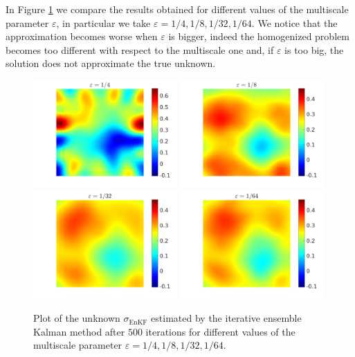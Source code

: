 \documentclass[10pt]{article}
\begin{document}
In Figure \ref{fig:comparison_e} we compare the results obtained for different values of the multiscale parameter $\varepsilon$, in particular we take $\varepsilon = 1/4, 1/8, 1/32, 1/64$. We notice that the approximation becomes worse when $\varepsilon$ is bigger, indeed the homogenized problem becomes too different with respect to the multiscale one and, if $\varepsilon$ is too big, the solution does not approximate the true unknown.

\begin{figure}[t]
\centering
\includegraphics[width = 0.49\textwidth]{figures/ensemble_500_e4}
\includegraphics[width = 0.49\textwidth]{figures/ensemble_500_e8}
\\
\includegraphics[width = 0.49\textwidth]{figures/ensemble_500_e32}
\includegraphics[width = 0.49\textwidth]{figures/ensemble_500_e64}
\caption{Plot of the unknown $\sigma_{\mathrm{EnKF}}$ estimated by the iterative ensemble Kalman method after $500$ iterations for different values of the multiscale parameter $\varepsilon = 1/4, 1/8, 1/32, 1/64$.}
\label{fig:comparison_e}
\end{figure}
\end{document}
